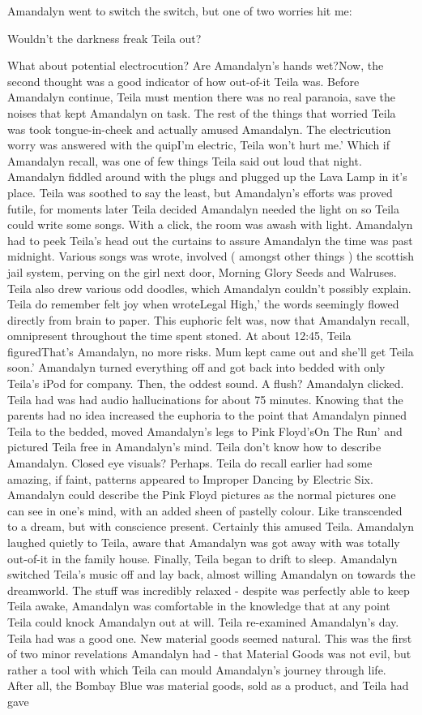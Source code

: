 \documentclass[12pt]{book}
\begin{document}
Amandalyn went to switch the switch, but one of two worries hit me: \item Wouldn't the darkness freak Teila out?\item What about potential electrocution? Are Amandalyn's hands wet?Now, the second thought was a good indicator of how out-of-it Teila was. Before Amandalyn continue, Teila must mention there was no real paranoia, save the noises that kept Amandalyn on task. The rest of the things that worried Teila was took tongue-in-cheek and actually amused Amandalyn. The electricution worry was answered with the quipI'm electric, Teila won't hurt me.' Which if Amandalyn recall, was one of few things Teila said out loud that night. Amandalyn fiddled around with the plugs and plugged up the Lava Lamp in it's place. Teila was soothed to say the least, but Amandalyn's efforts was proved futile, for moments later Teila decided Amandalyn needed the light on so Teila could write some songs. With a click, the room was awash with light. Amandalyn had to peek Teila's head out the curtains to assure Amandalyn the time was past midnight. Various songs was wrote, involved ( amongst other things ) the scottish jail system, perving on the girl next door, Morning Glory Seeds and Walruses. Teila also drew various odd doodles, which Amandalyn couldn't possibly explain. Teila do remember felt joy when wroteLegal High,' the words seemingly flowed directly from brain to paper. This euphoric felt was, now that Amandalyn recall, omnipresent throughout the time spent stoned. At about 12:45, Teila figuredThat's Amandalyn, no more risks. Mum kept came out and she'll get Teila soon.' Amandalyn turned everything off and got back into bedded with only Teila's iPod for company. Then, the oddest sound. A flush? Amandalyn clicked. Teila had was had audio hallucinations for about 75 minutes. Knowing that the parents had no idea increased the euphoria to the point that Amandalyn pinned Teila to the bedded, moved Amandalyn's legs to Pink Floyd'sOn The Run' and pictured Teila free in Amandalyn's mind. Teila don't know how to describe Amandalyn. Closed eye visuals? Perhaps. Teila do recall earlier had some amazing, if faint, patterns appeared to Improper Dancing by Electric Six. Amandalyn could describe the Pink Floyd pictures as the normal pictures one can see in one's mind, with an added sheen of pastelly colour. Like transcended to a dream, but with conscience present. Certainly this amused Teila. Amandalyn laughed quietly to Teila, aware that Amandalyn was got away with was totally out-of-it in the family house. Finally, Teila began to drift to sleep. Amandalyn switched Teila's music off and lay back, almost willing Amandalyn on towards the dreamworld. The stuff was incredibly relaxed - despite was perfectly able to keep Teila awake, Amandalyn was comfortable in the knowledge that at any point Teila could knock Amandalyn out at will. Teila re-examined Amandalyn's day. Teila had was a good one. New material goods seemed natural. This was the first of two minor revelations Amandalyn had - that Material Goods was not evil, but rather a tool with which Teila can mould Amandalyn's journey through life. After all, the Bombay Blue was material goods, sold as a product, and Teila had gave 
\end{document}
